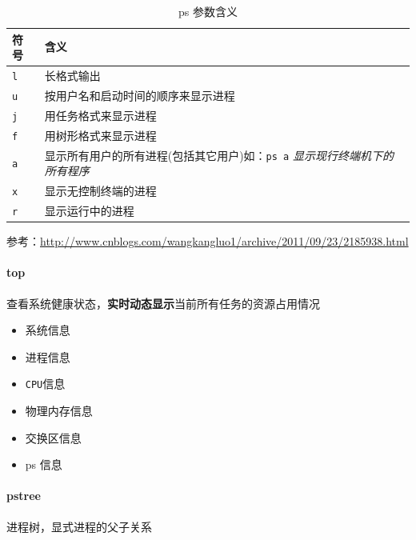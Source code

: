 \documentclass[UTF8,a4paper,12pt]{ctexbook}
\begin{document}
				\begin{table}[H]
					\centering
					\caption{ps 参数含义}
					\begin{tabular}{l|m{14cm}}
						\hline
						符号 	   	   & 含义\\
						\hline
						\verb|l |		&  长格式输出\\
						\verb|u	|		&  按用户名和启动时间的顺序来显示进程\\
						\verb|j	|		&  用任务格式来显示进程\\
						\verb|f	|		&  用树形格式来显示进程\\
						\verb|a |		&  显示所有用户的所有进程(包括其它用户)如：\verb|ps a| \textit{显示现行终端机下的所有程序}\\
						\verb|x	|		&  显示无控制终端的进程\\
						\verb|r	|		&  显示运行中的进程\\
						\hline
					\end{tabular}
				\end{table}	
				参考：\url{http://www.cnblogs.com/wangkangluo1/archive/2011/09/23/2185938.html}
		
		\paragraph{top} 查看系统健康状态，\textbf{实时动态显示}当前所有任务的资源占用情况
			\begin{itemize}
				\item 系统信息
				\item 进程信息
				\item \verb|CPU|信息
				\item 物理内存信息
				\item 交换区信息
				\item ps 信息
			\end{itemize}
		
		\paragraph{pstree} 进程树，显式进程的父子关系
		
\end{document}
